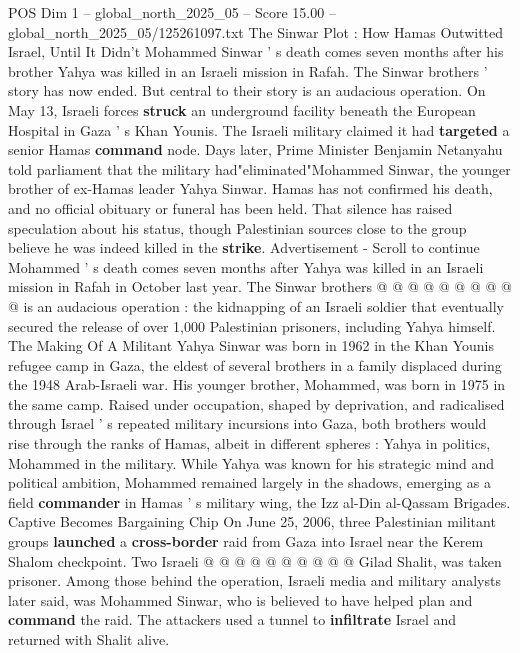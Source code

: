 \begin{textsample}{POS Dim 1 – global\_north\_2025\_05 – Score 15.00 – global\_north\_2025\_05/125261097.txt}  \label{ex:f1_pos_374}
The Sinwar Plot : How Hamas Outwitted Israel, Until It Didn't Mohammed Sinwar ' s death comes seven months after his brother Yahya was killed in an Israeli mission in Rafah.
The Sinwar brothers ' story has now ended.
But central to their story is an audacious operation.
On May 13, Israeli forces \textbf{struck} an underground facility beneath the European Hospital in Gaza ' s Khan Younis.
The Israeli military claimed it had \textbf{targeted} a senior Hamas \textbf{command} node.
Days later, Prime Minister Benjamin Netanyahu told parliament that the military had"eliminated"Mohammed Sinwar, the younger brother of ex-Hamas leader Yahya Sinwar.
Hamas has not confirmed his death, and no official obituary or funeral has been held.
That silence has raised speculation about his status, though Palestinian sources close to the group believe he was indeed killed in the \textbf{strike}.
Advertisement - Scroll to continue Mohammed ' s death comes seven months after Yahya was killed in an Israeli mission in Rafah in October last year.
The Sinwar brothers @ @ @ @ @ @ @ @ @ @ is an audacious operation : the kidnapping of an Israeli soldier that eventually secured the release of over 1,000 Palestinian prisoners, including Yahya himself.
The Making Of A Militant Yahya Sinwar was born in 1962 in the Khan Younis refugee camp in Gaza, the eldest of several brothers in a family displaced during the 1948 Arab-Israeli war.
His younger brother, Mohammed, was born in 1975 in the same camp.
Raised under occupation, shaped by deprivation, and radicalised through Israel ' s repeated military incursions into Gaza, both brothers would rise through the ranks of Hamas, albeit in different spheres : Yahya in politics, Mohammed in the military.
While Yahya was known for his strategic mind and political ambition, Mohammed remained largely in the shadows, emerging as a field \textbf{commander} in Hamas ' s military wing, the Izz al-Din al-Qassam Brigades.
Captive Becomes Bargaining Chip On June 25, 2006, three Palestinian militant groups \textbf{launched} a \textbf{cross-border} raid from Gaza into Israel near the Kerem Shalom checkpoint.
Two Israeli @ @ @ @ @ @ @ @ @ @ Gilad Shalit, was taken prisoner.
Among those behind the operation, Israeli media and military analysts later said, was Mohammed Sinwar, who is believed to have helped plan and \textbf{command} the raid.
The attackers used a tunnel to \textbf{infiltrate} Israel and returned with Shalit alive.

\end{textsample}
